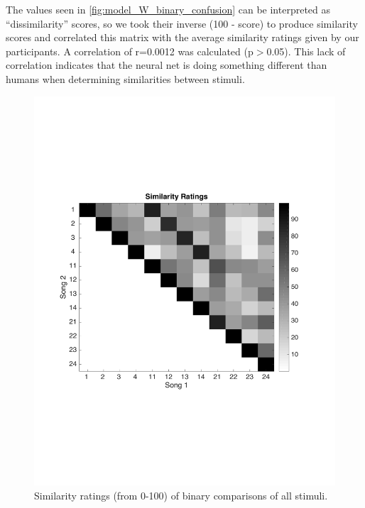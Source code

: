 The values seen in \autoref{fig:model_W_binary_confusion} can be interpreted as ``dissimilarity'' scores, so we took their inverse (100 - score) to produce similarity scores and correlated this matrix with the average similarity ratings given by our participants.
A correlation of r=0.0012 was calculated (p$>$0.05).
This lack of correlation indicates that the neural net is doing something different than humans when determining similarities between stimuli. 

\begin{figure}[h] 
  \begin{center}
    \includegraphics[scale=0.6]{Figures/Similarity}
    \caption{Similarity ratings (from 0-100) of binary comparisons of all stimuli.}
    \label{fig:Similarity}
  \end{center}
\end{figure}
